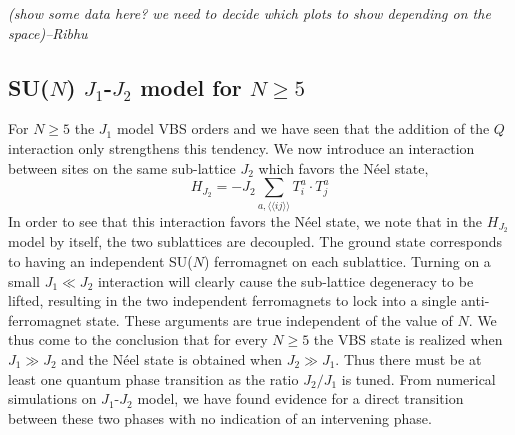 \documentclass[range]{ar2e}
\begin{document}
{\em (show some data here? we need to decide which plots to show
  depending on the space)--Ribhu}

\subsection{SU($N$) $J_1$-$J_2$ model for $N\geq 5$}
\label{ss:j1j2N}

For $N\geq 5$ the $J_1$ model VBS orders and we have seen that the
addition of the $Q$ interaction only strengthens this tendency. We now
introduce an interaction between sites on the same sub-lattice $J_2$ which favors the N\'eel state,
\begin{equation}
H_{J_2}= -J_2 \sum_{a,\langle\langle ij\rangle\rangle} T^a_i\cdot T^{a}_j
\end{equation}
In order to see that this interaction favors the N\'eel state, we note
that in the $H_{J_2}$ model by itself, the two sublattices are
decoupled. The ground state corresponds to having an independent SU($N$) ferromagnet on
each sublattice. Turning on a small $J_1\ll J_2$ interaction will clearly cause
the sub-lattice degeneracy to be lifted, resulting in the
two independent ferromagnets to lock into a single
anti-ferromagnet state. These arguments are true independent of the
value of $N$. We thus
come to the conclusion that for every $N\geq 5$ the VBS state is
realized when $J_1\gg J_2$ and the N\'eel state is obtained when $J_2
\gg J_1$. Thus there must be at least one quantum phase transition as
the ratio
$J_2/J_1$ is tuned. From numerical simulations on $J_1$-$J_2$ model, we have found
evidence for a direct transition between these two phases with no
indication of an intervening phase. 
\end{document}
